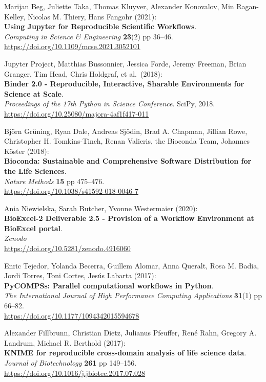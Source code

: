 \begin{thebibliography}{9}
Marijan Beg, Juliette Taka, Thomas Kluyver, Alexander
Konovalov, Min Ragan-Kelley, Nicolas M. Thiery, Hans Fangohr (2021):\\
\textbf{Using Jupyter for Reproducible Scientific Workflows}.\\
\emph{Computing in Science \& Engineering} \textbf{23}(2) pp 36--46.\\
\url{https://doi.org/10.1109/mcse.2021.3052101}

Jupyter Project, Matthias Bussonnier, Jessica Forde, Jeremy
Freeman, Brian Granger, Tim Head, Chris Holdgraf, et al.~(2018):\\
\textbf{Binder 2.0 - Reproducible, Interactive, Sharable Environments
for Science at Scale}.\\
\emph{Proceedings of the 17th Python in Science
Conference}. SciPy, 2018.\\
\url{https://doi.org/10.25080/majora-4af1f417-011}

Björn Grüning, Ryan Dale, Andreas Sjödin, Brad A. Chapman,
Jillian Rowe, Christopher H. Tomkins-Tinch, Renan Valieris, the Bioconda
Team, Johannes Köster (2018):\\
\textbf{Bioconda: Sustainable and Comprehensive Software Distribution
for the Life Sciences}.\\
\emph{Nature Methods} \textbf{15} pp 475--476.\\
\url{https://doi.org/10.1038/s41592-018-0046-7}

Ania Niewielska, Sarah Butcher, Yvonne Westermaier (2020):\\
\textbf{BioExcel-2 Deliverable 2.5 - Provision of a Workflow Environment
at BioExcel portal}.\\
\emph{Zenodo}\\
\url{https://doi.org/10.5281/zenodo.4916060}


Enric Tejedor, Yolanda Becerra, Guillem Alomar, Anna Queralt,
Rosa M. Badia, Jordi Torres, Toni Cortes, Jesús Labarta (2017):\\
\textbf{PyCOMPSs: Parallel computational workflows in Python}.\\
\emph{The
International Journal of High Performance Computing Applications}
\textbf{31}(1) pp 66--82.\\
\url{https://doi.org/10.1177/1094342015594678}

Alexander Fillbrunn, Christian Dietz, Julianus Pfeuffer, René
Rahn, Gregory A. Landrum, Michael R. Berthold (2017):\\
\textbf{KNIME for reproducible cross-domain analysis of life science
data}.\\
\emph{Journal of Biotechnology} \textbf{261} pp 149--156.\\
\url{https://doi.org/10.1016/j.jbiotec.2017.07.028}


\end{thebibliography}
